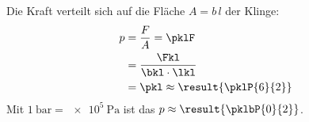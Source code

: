 Die Kraft verteilt sich auf die Fläche $A = b\,l$ der Klinge:
\begin{align}
 p &= \frac{F}{A} = \pklF \\
   &= \frac{\Fkl}{\bkl\cdot\lkl} \\
   &= \pkl \approx \result{\pklP{6}{2}}
\end{align}
Mit $\SI{1}{\bar} = \SI{e5}{\pascal}$ ist das $p \approx \result{\pklbP{0}{2}}$.
